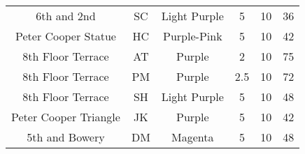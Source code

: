 \begin{center}
\begin{tabular}{|cccccc|}
    6th and 2nd           & SC                & Light Purple   & 5                               & 10                     & 36                  \\
    Peter Cooper Statue   & HC                & Purple-Pink    & 5                               & 10                     & 42                  \\
    8th Floor Terrace     & AT                & Purple         & 2                               & 10                     & 75                  \\
    8th Floor Terrace     & PM                & Purple         & 2.5                             & 10                     & 72                  \\
    8th Floor Terrace     & SH                & Light Purple   & 5                               & 10                     & 48                  \\
    Peter Cooper Triangle & JK                & Purple         & 5                               & 10                     & 42                  \\
    5th and Bowery        & DM                & Magenta        & 5                               & 10                     & 48\\\hline           
\end{tabular}
\end{center}
\newpage
